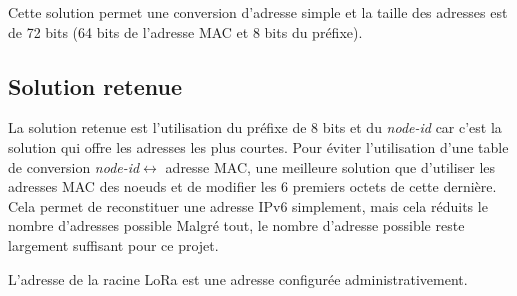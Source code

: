     Cette solution permet une conversion d'adresse simple et la taille des adresses est de 72 bits (64 bits de l'adresse MAC et 8 bits du préfixe).

\subsection*{Solution retenue}
    La solution retenue est l'utilisation du préfixe de 8 bits et du \textit{node-id} car c'est la solution qui offre les adresses les plus courtes. Pour éviter l'utilisation d'une table de conversion \textit{node-id}$\leftrightarrow$ adresse MAC, une meilleure solution que d'utiliser les adresses MAC des noeuds et de modifier les 6 premiers octets de cette dernière. Cela permet de reconstituer une adresse IPv6 simplement, mais cela réduits le nombre d'adresses possible
    Malgré tout, le nombre d'adresse possible reste largement suffisant pour ce projet.

    L'adresse de la racine LoRa est une adresse configurée administrativement.

